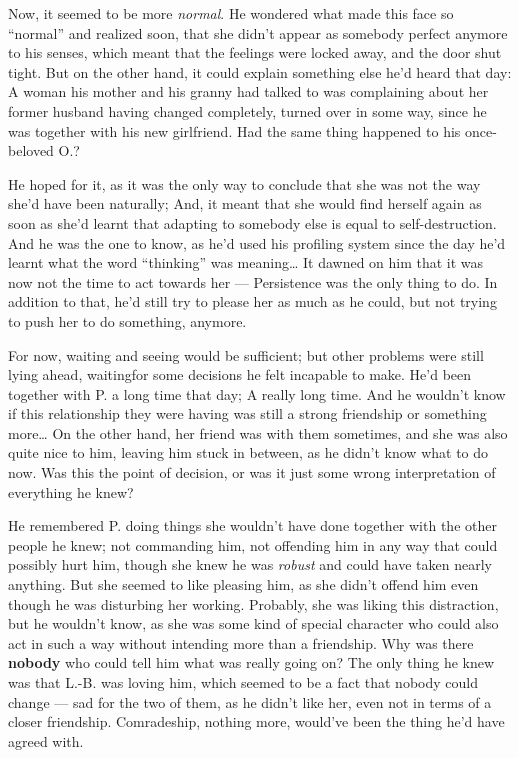 Now, it seemed to be more \emph{normal}. He wondered what made this face so \enquote{normal} and realized soon, that she didn't appear as somebody perfect anymore to his senses, which meant that the feelings were locked away, and the door shut tight.
But on the other hand, it could explain something else he'd heard that day: A woman his mother and his granny had talked to was complaining about her former husband having changed completely, turned over in some way, since he was together with his new girlfriend. Had the same thing happened to his once-beloved O.?

He hoped for it, as it was the only way to conclude that she was not the way she'd have been naturally; And, it meant that she would find herself again as soon as she'd learnt that adapting to somebody else is equal to self-destruction. And he was the one to know, as he'd used his profiling system since the day he'd learnt what the word \enquote{thinking} was meaning\ldots
It dawned on him that it was now not the time to act towards her --- Persistence was the only thing to do. In addition to that, he'd still try to please her as much as he could, but not trying to push her to do something, anymore.

For now, waiting and seeing would be sufficient; but other problems were still lying ahead, waitingfor some decisions he felt incapable to make. He'd been together with P. a long time that day; A really long time. And he wouldn't know if this relationship they were having was still a strong friendship or something more\ldots
On the other hand, her friend was with them sometimes, and she was also quite nice to him, leaving him stuck in between, as he didn't know what to do now. 
Was this the point of decision, or was it just some wrong interpretation of everything he knew?

He remembered P. doing things she wouldn't have done together with the other people he knew; not commanding him, not offending him in any way that could possibly hurt him, though she knew he was \emph{robust} and could have taken nearly anything. But she seemed to like pleasing him, as she didn't offend him even though he was disturbing her working. 
Probably, she was liking this distraction, but he wouldn't know, as she was some kind of special character who could also act in such a way without intending more than a friendship. 
Why was there \textbf{nobody} who could tell him what was really going on? The only thing he knew was that L.-B. was loving him, which seemed to be a fact that nobody could change --- sad for the two of them, as he didn't like her, even not in terms of a closer friendship. Comradeship, nothing more, would've been the thing he'd have agreed with.

